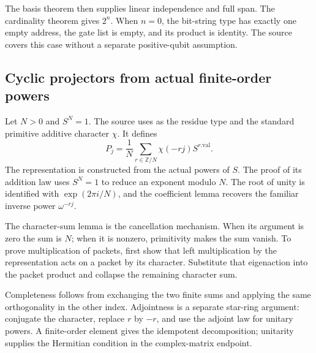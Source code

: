
The basis theorem then supplies linear independence and full span. The cardinality theorem gives $2^n$. When $n=0$, the bit-string type has exactly one empty address, the gate list is empty, and its product is identity. The source covers this case without a separate positive-qubit assumption.

\subsection{Cyclic projectors from actual finite-order powers}
Let $N>0$ and $S^N=1$. The source uses  as the residue type and the standard primitive additive character $\chi$. It defines
\[
P_j=\frac1N\sum_{r\in\mathbb Z/N}\chi(-rj)S^{r.\mathrm{val}}.
\]
The representation  is constructed from the actual powers of $S$. The proof of its addition law uses $S^N=1$ to reduce an exponent modulo $N$. The root of unity is identified with $\exp(2\pi i/N)$, and the coefficient lemma recovers the familiar inverse power $\omega^{-rj}$.


The character-sum lemma is the cancellation mechanism. When its argument is zero the sum is $N$; when it is nonzero, primitivity makes the sum vanish. To prove multiplication of packets, first show that left multiplication by the representation acts on a packet by its character. Substitute that eigenaction into the packet product and collapse the remaining character sum.


Completeness follows from exchanging the two finite sums and applying the same orthogonality in the other index. Adjointness is a separate star-ring argument: conjugate the character, replace $r$ by $-r$, and use the adjoint law for unitary powers. A finite-order element gives the idempotent decomposition; unitarity supplies the Hermitian condition in the complex-matrix endpoint.



